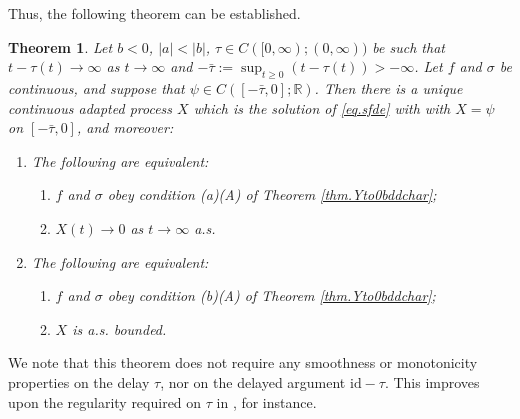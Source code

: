 \documentclass[a4paper,10pt,reqno]{amsart}
\numberwithin{equation}{section}
\newtheorem{theorem}{Theorem}
\theoremstyle{definition}
\theoremstyle{remark}
\DeclareMathOperator{\1}{\mathbbm 1}
\begin{document}
Thus, the following theorem can be established.
\begin{theorem}
Let $b<0$, $|a|<|b|$, $\tau\in C([0,\infty);(0,\infty))$ be such that 
$t-\tau(t)\to \infty$ as $t\to\infty$ and $-\bar{\tau}:=\sup_{t\geq 0}(t-\tau(t)) >-\infty$. Let $f$ and $\sigma$ be continuous, and suppose that $\psi\in C([-\bar{\tau},0];\mathbb{R})$. Then there is a unique continuous adapted process $X$ which is the solution of \eqref{eq.sfde} with 
with $X=\psi$ on $[-\bar{\tau},0]$, and moreover:
\begin{enumerate}
	\item[(a)] The following are equivalent:
	\begin{enumerate}
		\item[(A)] $f$ and $\sigma$ obey condition (a)(A) of Theorem \ref{thm.Yto0bddchar};
		\item[(B)] $X(t)\to 0$ as $t\to\infty$ a.s.
	\end{enumerate} 
	\item[(b)] The following are equivalent:
	\begin{enumerate}
		\item[(A)] $f$ and $\sigma$ obey condition (b)(A) of Theorem \ref{thm.Yto0bddchar};
		\item[(B)] $X$ is a.s. bounded. 
	\end{enumerate} 
\end{enumerate}
\end{theorem}
We note that this theorem does not require any smoothness or monotonicity properties on the delay $\tau$, nor on the delayed argument $\text{id}-\tau$. This improves upon the regularity required on $\tau$ in \cite{cermak}, for instance.
\end{document}
